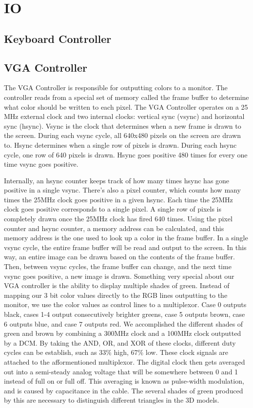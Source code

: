 \documentclass[onecolumn]{IEEEtran}
\begin{document}
\section{IO}
\subsection{Keyboard Controller}

\subsection{VGA Controller}
The VGA Controller is responsible for outputting colors to a monitor.  The controller reads from a special set of memory called the frame buffer to determine what color should be written to each pixel.  The VGA Controller operates on a 25 MHz external clock and two internal clocks: vertical sync (vsync) and horizontal sync (hsync).  Vsync is the clock that determines when a new frame is drawn to the screen.  During each vsync cycle, all 640x480 pixels on the screen are drawn to.  Hsync determines when a single row of pixels is drawn.  During each hsync cycle, one row of 640 pixels is drawn.  Hsync goes positive 480 times for every one time vsync goes positive.

Internally, an hsync counter keeps track of how many times hsync has gone positive in a single vsync.  There’s also a pixel counter, which counts how many times the 25MHz clock goes positive in a given hsync.  Each time the 25MHz clock goes positive corresponds to a single pixel.  A single row of pixels is completely drawn once the 25MHz clock has fired 640 times.  Using the pixel counter and hsync counter, a memory address can be calculated, and this memory address is the one used to look up a color in the frame buffer.  In a single vsync cycle, the entire frame buffer will be read and output to the screen.  In this way, an entire image can be drawn based on the contents of the frame buffer.  Then, between vsync cycles, the frame buffer can change, and the next time vsync goes positive, a new image is drawn.  Something very special about our VGA controller is the ability to display multiple shades of green.  Instead of mapping our 3 bit color values directly to the RGB lines outputting to the monitor, we use the color values as control lines to a multiplexor.  Case 0 outputs black, cases 1-4 output consecutively brighter greens, case 5 outputs brown, case 6 outputs blue, and case 7 outputs red.  We accomplished the different shades of green and brown by combining a 300MHz clock and a 100MHz clock outputted by a DCM.  By taking the AND, OR, and XOR of these clocks, different duty cycles can be establish, such as 33\% high, 67\% low.  These clock signals are attached to the afformentioned multiplexor.  The digital clock then gets averaged out into a semi-steady analog voltage that will be somewhere between 0 and 1 instead of full on or full off.  This averaging is known as pulse-width modulation, and is caused by capacitance in the cable.  The several shades of green produced by this are necessary to distinguish different triangles in the 3D models.
\end{document}
